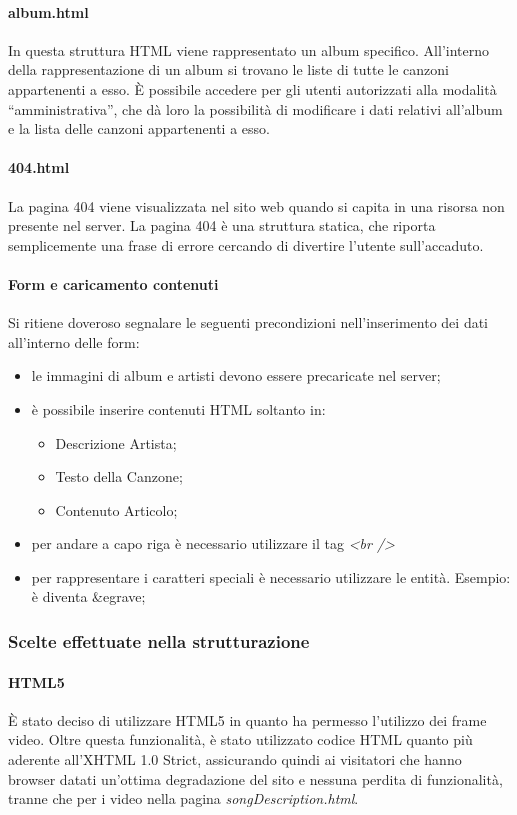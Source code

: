 \paragraph*{album.html} In questa struttura HTML viene rappresentato un album specifico. All'interno della rappresentazione di un album si trovano le liste di tutte le canzoni appartenenti a esso. È possibile accedere per gli utenti autorizzati alla modalità ``amministrativa'', che d\`a loro la possibilità di modificare i dati relativi all'album e la lista delle canzoni appartenenti a esso. %

\paragraph*{404.html} La pagina 404 viene visualizzata nel sito web quando si capita in una risorsa non presente nel server. La pagina 404 è una struttura statica, che riporta semplicemente una frase di errore cercando di divertire l'utente sull'accaduto.

\paragraph*{Form e caricamento contenuti}Si ritiene doveroso segnalare le seguenti precondizioni nell'inserimento dei dati all'interno delle form:
\begin{itemize}
	\item le immagini di album e artisti devono essere precaricate nel server;
	\item \`e possibile inserire contenuti HTML soltanto in:
	\begin{itemize}
		\item Descrizione Artista;
		\item Testo della Canzone;
		\item Contenuto Articolo;
	\end{itemize}
	\item per andare a capo riga \`e necessario utilizzare il tag \textit{<br />}
	\item per rappresentare i caratteri speciali \`e necessario utilizzare le entit\`a. Esempio: \`e diventa &egrave;
\end{itemize}

\subsubsection{Scelte effettuate nella strutturazione}

\paragraph{HTML5}
È stato deciso di utilizzare HTML5 in quanto ha permesso l'utilizzo dei frame video. Oltre questa funzionalità, è stato utilizzato codice HTML quanto più aderente all'XHTML 1.0 Strict, assicurando quindi ai visitatori che hanno browser datati un'ottima degradazione del sito e nessuna perdita di funzionalità, tranne che per i video nella pagina \textit{songDescription.html}.
